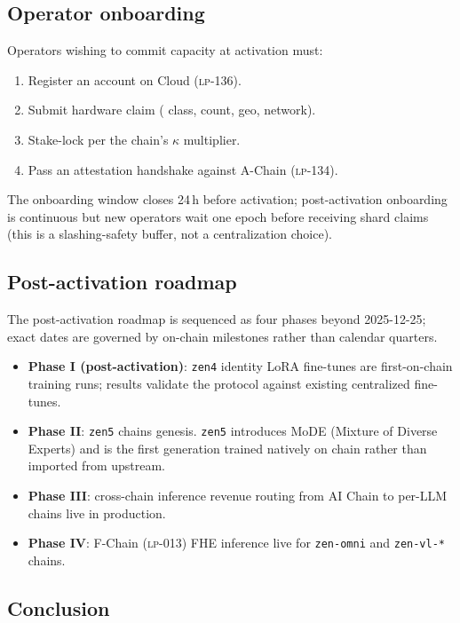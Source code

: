 \subsection{Operator onboarding}

Operators wishing to commit capacity at activation must:
\begin{enumerate}[nosep]
\item Register an account on \Lux{} Cloud (\textsc{lp-136}).
\item Submit hardware claim (\GPU{} class, count, geo, network).
\item Stake-lock per the chain's $\kappa$ multiplier.
\item Pass an attestation handshake against A-Chain (\textsc{lp-134}).
\end{enumerate}

The onboarding window closes 24\,h before activation; post-activation onboarding is continuous but new operators wait one epoch before receiving shard claims (this is a slashing-safety buffer, not a centralization choice).

\subsection{Post-activation roadmap}

The post-activation roadmap is sequenced as four phases beyond 2025-12-25; exact dates are governed by on-chain milestones rather than calendar quarters.

\begin{itemize}[nosep]
\item \textbf{Phase I (post-activation)}: \texttt{zen4} identity LoRA fine-tunes are first-on-chain training runs; results validate the protocol against existing centralized fine-tunes.
\item \textbf{Phase II}: \texttt{zen5} chains genesis. \texttt{zen5} introduces MoDE (Mixture of Diverse Experts) and is the first \Zen{} generation trained natively on chain rather than imported from upstream.
\item \textbf{Phase III}: cross-chain inference revenue routing from \Hanzo{} AI Chain to \Zoo{} per-LLM chains live in production.
\item \textbf{Phase IV}: F-Chain (\textsc{lp-013}) FHE inference live for \texttt{zen-omni} and \texttt{zen-vl-*} chains.
\end{itemize}

\subsection{Conclusion}

